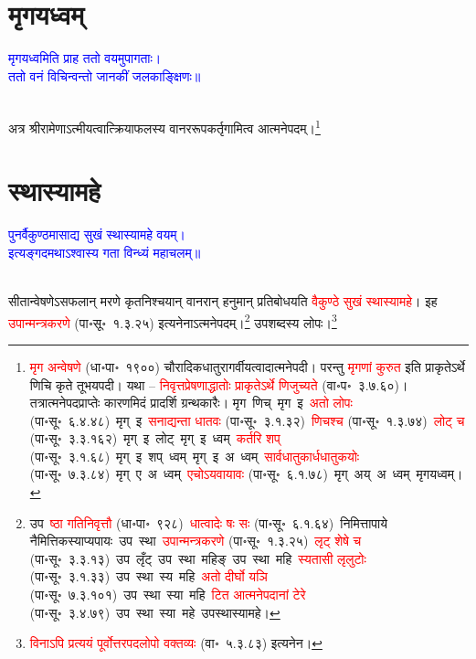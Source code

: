 \section[मृगयध्वम्]{मृगयध्वम्}
\centering\textcolor{blue}{मृगयध्वमिति प्राह ततो वयमुपागताः।\nopagebreak\\
ततो वनं विचिन्वन्तो जानकीं जलकाङ्क्षिणः॥}\nopagebreak\\
\\
\fontsize{14}{21}\selectfont\begin{sloppypar}\justifying\noindent\hspace{10mm} अत्र श्रीरामेणाऽत्मीयत्वात्क्रिया\-फलस्य वानर\-रूप\-कर्तृ\-गामित्व आत्मनेपदम्।\footnote{\textcolor{red}{मृग अन्वेषणे} (धा॰पा॰~१९००) चौरादिक\-धातुरागर्वीयत्वादात्मने\-पदी। परन्तु \textcolor{red}{मृगणां कुरुत} इति प्राकृतेऽर्थे णिचि कृते तूभयपदी। यथा – \textcolor{red}{निवृत्तप्रेषणाद्धातोः प्राकृतेऽर्थे णिजुच्यते} (वा॰प॰~३.७.६०)। तत्रात्मनेपद\-प्राप्तेः कारणमिदं प्रादर्शि ग्रन्थकारैः। मृग~णिच्~\arrow मृग~इ~\arrow \textcolor{red}{अतो लोपः} (पा॰सू॰~६.४.४८)~\arrow मृग्~इ~\arrow \textcolor{red}{सनाद्यन्ता धातवः} (पा॰सू॰~३.१.३२)~\arrow \textcolor{red}{णिचश्च} (पा॰सू॰~१.३.७४)~\arrow \textcolor{red}{लोट् च} (पा॰सू॰~३.३.१६२)~\arrow मृग्~इ~लोट्~\arrow मृग्~इ~ध्वम्~\arrow \textcolor{red}{कर्तरि शप्} (पा॰सू॰~३.१.६८)~\arrow मृग्~इ~शप्~ध्वम्~\arrow मृग्~इ~अ~ध्वम्~\arrow \textcolor{red}{सार्वधातुकार्ध\-धातुकयोः} (पा॰सू॰~७.३.८४)~\arrow मृग्~ए~अ~ध्वम्~\arrow \textcolor{red}{एचोऽयवायावः} (पा॰सू॰~६.१.७८)~\arrow मृग्~अय्~अ~ध्वम्~\arrow मृगयध्वम्।}\end{sloppypar}
\section[स्थास्यामहे]{स्थास्यामहे}
\centering\textcolor{blue}{पुनर्वैकुण्ठमासाद्य सुखं स्थास्यामहे वयम्।\nopagebreak\\
इत्यङ्गदमथाऽश्वास्य गता विन्ध्यं महाचलम्॥}\nopagebreak\\
\\
\fontsize{14}{21}\selectfont\begin{sloppypar}\justifying\noindent\hspace{10mm} सीतान्वेषणेऽसफलान् मरणे कृत\-निश्चयान् वानरान् हनुमान् प्रतिबोधयति \textcolor{red}{वैकुण्ठे सुखं स्थास्यामहे}। इह \textcolor{red}{उपान्मन्त्र\-करणे} (पा॰सू॰~१.३.२५) इत्यनेनाऽत्मनेपदम्।\footnote{उप~\textcolor{red}{ष्ठा गतिनिवृत्तौ} (धा॰पा॰~९२८)~\arrow \textcolor{red}{धात्वादेः षः सः} (पा॰सू॰~६.१.६४)~\arrow निमित्तापाये नैमित्तिकस्याप्यपायः~\arrow उप~स्था~\arrow \textcolor{red}{उपान्मन्त्र\-करणे} (पा॰सू॰~१.३.२५)~\arrow \textcolor{red}{लृट् शेषे च} (पा॰सू॰~३.३.१३)~\arrow उप~लृँट्~\arrow उप~स्था~महिङ्~\arrow उप~स्था~महि~\arrow \textcolor{red}{स्यतासी लृलुटोः} (पा॰सू॰~३.१.३३)~\arrow उप~स्था~स्य~महि~\arrow \textcolor{red}{अतो दीर्घो यञि} (पा॰सू॰~७.३.१०१)~\arrow उप~स्था~स्या~महि~\arrow \textcolor{red}{टित आत्मनेपदानां टेरे} (पा॰सू॰~३.४.७९)~\arrow उप~स्था~स्या~महे~\arrow उपस्थास्यामहे।} उप\-शब्दस्य लोपः।\footnote{\textcolor{red}{विनाऽपि प्रत्ययं पूर्वोत्तर\-पद\-लोपो वक्तव्यः} (वा॰~५.३.८३) इत्यनेन।}\end{sloppypar}
